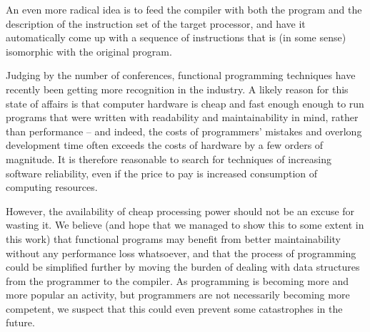 An even more radical idea is to feed the compiler with both
the program and the description of the instruction set of
the target processor, and have it automatically come up with
a sequence of instructions that is (in some sense) isomorphic
with the original program.

Judging by the number of conferences, functional programming
techniques have recently been getting more recognition in the industry.
A likely reason for this state of affairs is that computer hardware
is cheap and fast enough enough to run programs that were written
with readability and maintainability in mind, rather than performance
-- and indeed, the costs of programmers' mistakes and overlong
development time often exceeds the costs of hardware by a few
orders of magnitude. It is therefore reasonable to search for
techniques of increasing software reliability, even if the price
to pay is increased consumption of computing resources.

However, the availability of cheap processing power should not be
an excuse for wasting it. We believe (and hope that we managed to show
this to some extent in this work) that functional programs may
benefit from better maintainability without any performance loss
whatsoever, and that the process of programming could be simplified
further by moving the burden of dealing with data structures from
the programmer to the compiler. As programming is becoming more
and more popular an activity, but programmers are not necessarily
becoming more competent, we suspect that this could even prevent
some catastrophes in the future.









